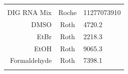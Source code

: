 \documentclass[11pt,singlespacinge,twoside]{reedthesis} %
\begin{document}
\begin{longtable}[]{@{}rcl@{}}
\begin{minipage}[t]{0.16\columnwidth}
\strut
\end{minipage}\tabularnewline
\begin{minipage}[t]{0.26\columnwidth}\raggedleft
DIG RNA Mix\strut
\end{minipage} & \begin{minipage}[t]{0.50\columnwidth}\centering
Roche\strut
\end{minipage} & \begin{minipage}[t]{0.16\columnwidth}\raggedright
11277073910\strut
\end{minipage}\tabularnewline
\begin{minipage}[t]{0.26\columnwidth}\raggedleft
DMSO\strut
\end{minipage} & \begin{minipage}[t]{0.50\columnwidth}\centering
Roth\strut
\end{minipage} & \begin{minipage}[t]{0.16\columnwidth}\raggedright
4720.2\strut
\end{minipage}\tabularnewline
\begin{minipage}[t]{0.26\columnwidth}\raggedleft
EtBr\strut
\end{minipage} & \begin{minipage}[t]{0.50\columnwidth}\centering
Roth\strut
\end{minipage} & \begin{minipage}[t]{0.16\columnwidth}\raggedright
2218.3\strut
\end{minipage}\tabularnewline
\begin{minipage}[t]{0.26\columnwidth}\raggedleft
EtOH\strut
\end{minipage} & \begin{minipage}[t]{0.50\columnwidth}\centering
Roth\strut
\end{minipage} & \begin{minipage}[t]{0.16\columnwidth}\raggedright
9065.3\strut
\end{minipage}\tabularnewline
\begin{minipage}[t]{0.26\columnwidth}\raggedleft
Formaldehyde\strut
\end{minipage} & \begin{minipage}[t]{0.50\columnwidth}\centering
Roth\strut
\end{minipage} & \begin{minipage}[t]{0.16\columnwidth}\raggedright
7398.1\strut
\end{minipage}\tabularnewline
\begin{minipage}[t]{0.26\columnwidth}\raggedleft

\end{minipage}
\end{longtable}
\end{document}
